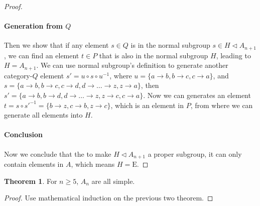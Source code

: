 \documentclass[]{article}
\theoremstyle{definition}\newtheorem{theorem}{Theorem}
\begin{document}
\begin{proof}
\paragraph{Generation from $Q$}Then we show that if any element $s\in Q$ is in the normal subgroup $s \in H\triangleleft A_{n+1}$, we can find an element $t \in P$ that is also in the normal subgroup $H$, leading to $H = A_{n+1}$. We can use normal subgroup's definition to generate another category-$Q$ element $s' = u\circ s \circ u^{-1}$, where $u = \{a\rightarrow b,b\rightarrow c, c\rightarrow a\}$, and $s = \{a\rightarrow b,b\rightarrow c,c\rightarrow d,d\rightarrow \dots\rightarrow z,z\rightarrow a\}$, then $s' = \{a\rightarrow b,b\rightarrow d,d\rightarrow \dots\rightarrow z,z\rightarrow c,c\rightarrow a\}$. Now we can generates an element $t = s\circ s'^{-1} = \{b\rightarrow z,c\rightarrow b,z\rightarrow c\}$, which is an element in $P$, from where we can generate all elements into $H$.

\paragraph{Conclusion}Now we conclude that the to make $H \triangleleft A_{n+1}$ a proper subgroup, it can only contain elements in $A$, which means $H = \mathrm{E}$.

\end{proof}

\begin{theorem}
	\label{an-simple}
	For $n \ge 5$, $A_n$ are all simple.
\end{theorem}
\begin{proof}
	Use mathematical induction on the previous two theorem.
\end{proof}
\end{document}
